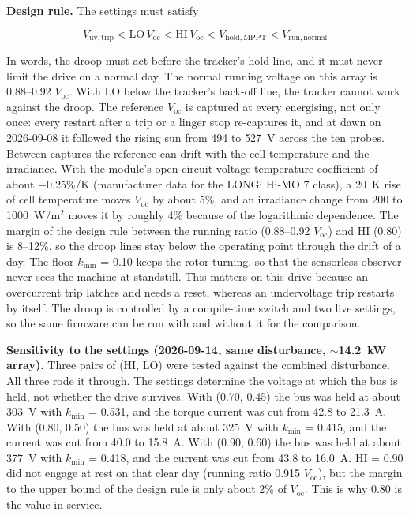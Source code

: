\documentclass[journal]{IEEEtran}
\begin{document}
\textbf{Design rule.} The settings must satisfy

\begin{equation}
V_{\mathrm{uv,trip}} < \mathrm{LO}\,V_{\mathrm{oc}} < \mathrm{HI}\,V_{\mathrm{oc}} < V_{\mathrm{hold,MPPT}} < V_{\mathrm{run,normal}}
\label{eq:19}
\end{equation}

In words, the droop must act before the tracker's hold line, and it must never limit the drive on a normal day. The normal running voltage on this array is 0.88--0.92 $V_{\mathrm{oc}}$. With LO below the tracker's back-off line, the tracker cannot work against the droop. The reference $V_{\mathrm{oc}}$ is captured at every energising, not only once: every restart after a trip or a linger stop re-captures it, and at dawn on 2026-09-08 it followed the rising sun from 494 to 527~V across the ten probes. Between captures the reference can drift with the cell temperature and the irradiance. With the module's open-circuit-voltage temperature coefficient of about $-$0.25\%/K (manufacturer data for the LONGi Hi-MO 7 class), a 20~K rise of cell temperature moves $V_{\mathrm{oc}}$ by about 5\%, and an irradiance change from 200 to 1000~W/m$^{2}$ moves it by roughly 4\% because of the logarithmic dependence. The margin of the design rule between the running ratio (0.88--0.92 $V_{\mathrm{oc}}$) and HI (0.80) is 8--12\%, so the droop lines stay below the operating point through the drift of a day. The floor $k_{\min}$ = 0.10 keeps the rotor turning, so that the sensorless observer never sees the machine at standstill. This matters on this drive because an overcurrent trip latches and needs a reset, whereas an undervoltage trip restarts by itself. The droop is controlled by a compile-time switch and two live settings, so the same firmware can be run with and without it for the comparison.

\textbf{Sensitivity to the settings (2026-09-14, same disturbance, $\sim$14.2~kW array).} Three pairs of (HI, LO) were tested against the combined disturbance. All three rode it through. The settings determine the voltage at which the bus is held, not whether the drive survives. With (0.70, 0.45) the bus was held at about 303~V with $k_{\min}$ = 0.531, and the torque current was cut from 42.8 to 21.3~A. With (0.80, 0.50) the bus was held at about 325~V with $k_{\min}$ = 0.415, and the current was cut from 40.0 to 15.8~A. With (0.90, 0.60) the bus was held at about 377~V with $k_{\min}$ = 0.418, and the current was cut from 43.8 to 16.0~A. HI = 0.90 did not engage at rest on that clear day (running ratio 0.915 $V_{\mathrm{oc}}$), but the margin to the upper bound of the design rule is only about 2\% of $V_{\mathrm{oc}}$. This is why 0.80 is the value in service.
\end{document}
